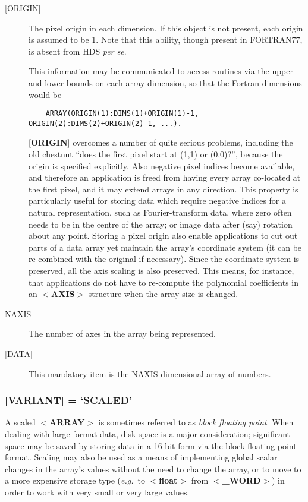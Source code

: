 \begin{description}
\item [{[}ORIGIN{]}]
The pixel origin in each dimension.  If this object is not present,
each origin is assumed to be 1.  Note that this
ability, though present in FORTRAN77, is
absent from HDS {\it per se}.

This information may be communicated to 
access routines via the upper and lower bounds on each array dimension, 
so that the Fortran dimensions would be 
\begin{verbatim}
    ARRAY(ORIGIN(1):DIMS(1)+ORIGIN(1)-1, ORIGIN(2):DIMS(2)+ORIGIN(2)-1, ...).
\end{verbatim}

{[}{\bf ORIGIN}{]} overcomes a number of quite serious problems,
including the old chestnut ``does the first pixel start at (1,1) or
(0,0)?'', because the origin is specified explicitly. Also negative
pixel indices become available, and therefore an application is freed
from having every array co-located at the first pixel, and it may extend
arrays in any direction. This property is particularly useful for
storing data which require negative indices for a natural
representation, such as Fourier-transform data, where zero often needs to
be in the centre of the array; or image data after (say) rotation about
any point.  Storing a pixel origin also enable applications to cut out parts
of a data array yet maintain the array's coordinate system (it can be
re-combined with the original if necessary). Since the coordinate
system is preserved, all the axis scaling is also preserved. This means,
for instance, that applications do not have to re-compute the polynomial
coefficients in an $<${\bf AXIS}$>$ structure when the array size is
changed.
\item [NAXIS]
The number of axes in the array being represented.
\item [{[}DATA{]}]
This mandatory item is the NAXIS-dimensional array of numbers.
\end{description}

\subsubsection{{[}{\bf VARIANT}{]} = `SCALED'}
A scaled \mbox{$<${\bf ARRAY}$>$} is sometimes referred
to as {\it block floating point}. 
When dealing with large-format data, disk space is a major
consideration; significant space may be saved by storing data in a
16-bit form via the block floating-point format.  Scaling may also be
used as a means of implementing global scalar changes in the array's
values without the need to change the array, or to move to a more
expensive storage type ({\it e.g.}\  to $<${\bf float}$>$ from
$<${\bf \_WORD}$>$) in order to work with very small or very large values. 

